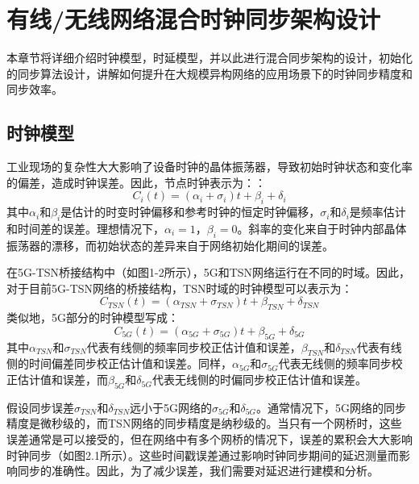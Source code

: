 \documentclass[UTF8,a4paper,12pt]{ctexart}
\numberwithin{equation}{section}
\begin{document}
\newpage
{}
\section{有线/无线网络混合时钟同步架构设计}

本章节将详细介绍时钟模型，时延模型，并以此进行混合同步架构的设计，初始化的同步算法设计，讲解如何提升在大规模异构网络的应用场景下的时钟同步精度和同步效率。

\subsection{时钟模型}
工业现场的复杂性大大影响了设备时钟的晶体振荡器，导致初始时钟状态和变化率的偏差，造成时钟误差。因此，节点时钟表示为：：
\begin{equation}
	C_i(t) = (\alpha _i+\sigma_i)t + \beta _i +\delta_i
\end{equation}
其中$\alpha_i$和$\beta_i$是估计的时变时钟偏移和参考时钟的恒定时钟偏移，$\sigma_i$和$\delta_i$是频率估计和时间差的误差。理想情况下，$\alpha_i = 1$，$\beta_i = 0$。斜率的变化来自于时钟内部晶体振荡器的漂移，而初始状态的差异来自于网络初始化期间的误差。

在5G-TSN桥接结构中（如图1-2所示），5G和TSN网络运行在不同的时域。因此，对于目前5G-TSN网络的桥接结构，TSN时域的时钟模型可以表示为：
\begin{equation}
	C_{TSN}(t) = (\alpha_{TSN}+\sigma_{TSN})t + \beta _{TSN} +\delta_{TSN}
\end{equation}
类似地，5G部分的时钟模型写成：
\begin{equation}
	C_{5G}(t) = (\alpha_{5G}+\sigma_{5G})t + \beta _{5G} +\delta_{5G}
\end{equation}
其中$\alpha_{TSN}$和$\sigma_{TSN}$代表有线侧的频率同步校正估计值和误差，$\beta_{TSN}$和$\delta_{TSN}$代表有线侧的时间偏差同步校正估计值和误差。同样，$\alpha_{5G}$和$\sigma_{5G}$代表无线侧的频率同步校正估计值和误差，而$\beta_{5G}$和$\delta_{5G}$代表无线侧的时偏同步校正估计值和误差。

假设同步误差$\sigma_{TSN}$和$\delta_{TSN}$远小于5G网络的$\sigma_{5G}$和$\delta_{5G}$。通常情况下，5G网络的同步精度是微秒级的，而TSN网络的同步精度是纳秒级的。当只有一个网桥时，这些误差通常是可以接受的，但在网络中有多个网桥的情况下，误差的累积会大大影响时钟同步（如图2.1所示）。这些时间戳误差通过影响时钟同步期间的延迟测量而影响同步的准确性。因此，为了减少误差，我们需要对延迟进行建模和分析。
\end{document}
